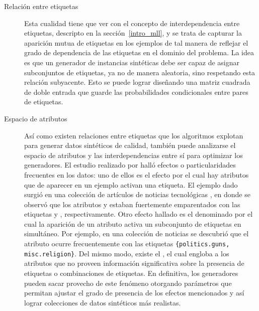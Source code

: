 \begin{description}
	\item[Relación entre etiquetas] Esta cualidad tiene que ver con el concepto de
	      interdependencia entre etiquetas, descripto en la sección~\ref{intro_mll},
	      y se trata de capturar la aparición mutua de etiquetas en los ejemplos de
	      tal manera de reflejar el grado de dependencia de las etiquetas en el
	      dominio del problema. La idea es que un generador de instancias sintéticas
	      debe ser capaz de asignar subconjuntos de etiquetas, ya no de manera
	      aleatoria, sino respetando esta relación subyacente. Esto se puede lograr
	      diseñando una matriz cuadrada de doble entrada que guarde las
	      probabilidades condicionales entre pares de etiquetas.

	\item[Espacio de atributos] Así como existen relaciones entre etiquetas que
	      los algoritmos explotan para generar datos sintéticos de calidad, también
	      puede analizarse el espacio de atributos y las interdependencias entre sí
	      para optimizar los generadores. El estudio realizado por
	      \citeauthor{read_generating_2009} halló efectos o particularidades
	      frecuentes en los datos: uno de ellos es el efecto
	       por el cual hay atributos que de aparecer en
	      un ejemplo activan una etiqueta. El ejemplo dado surgió en una colección
	      de artículos de noticias tecnológicas \cite{read_classifier_2011}, en
	      donde se observó que los atributos  y
	       estaban fuertemente emparentados con las
	      etiquetas  y ,
	      respectivamente. Otro efecto hallado es el denominado
	       por el cual la aparición de un atributo
	      activa un subconjunto de etiquetas en simultáneo. Por ejemplo, en una
	      colección de noticias \cite{lang_newsweeder_1995} se descubrió que el
	      atributo  ocurre frecuentemente con las etiquetas
	      \texttt{\{politics.guns, misc.religion\}}. Del mismo modo, existe el
	      , el cual engloba a los atributos que no proveen
	      información significativa sobre la presencia de etiquetas o combinaciones
	      de etiquetas. En definitiva, los generadores pueden sacar provecho de este
	      fenómeno otorgando parámetros que permitan ajustar el grado de presencia
	      de los efectos mencionados y así lograr colecciones de datos sintéticos
	      más realistas.

\end{description}
